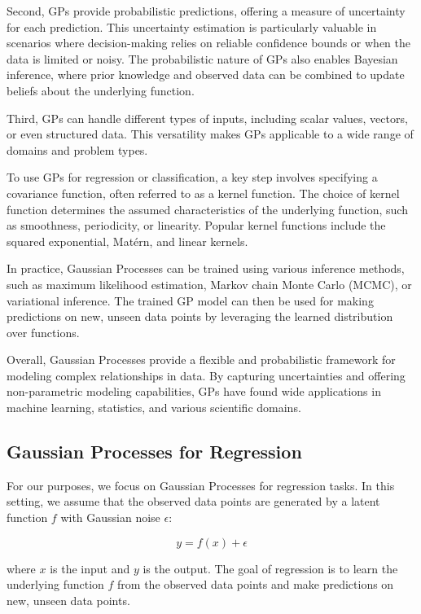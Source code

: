 \documentclass[preprint,journal]{vgtc}       %
\begin{document}
Second, GPs provide probabilistic predictions, offering a measure of uncertainty for each prediction. This uncertainty estimation is particularly valuable in scenarios where decision-making relies on reliable confidence bounds or when the data is limited or noisy. The probabilistic nature of GPs also enables Bayesian inference, where prior knowledge and observed data can be combined to update beliefs about the underlying function.

Third, GPs can handle different types of inputs, including scalar values, vectors, or even structured data. This versatility makes GPs applicable to a wide range of domains and problem types.

To use GPs for regression or classification, a key step involves specifying a covariance function, often referred to as a kernel function. The choice of kernel function determines the assumed characteristics of the underlying function, such as smoothness, periodicity, or linearity. Popular kernel functions include the squared exponential, Matérn, and linear kernels.

In practice, Gaussian Processes can be trained using various inference methods, such as maximum likelihood estimation, Markov chain Monte Carlo (MCMC), or variational inference. The trained GP model can then be used for making predictions on new, unseen data points by leveraging the learned distribution over functions.

Overall, Gaussian Processes provide a flexible and probabilistic framework for modeling complex relationships in data. By capturing uncertainties and offering non-parametric modeling capabilities, GPs have found wide applications in machine learning, statistics, and various scientific domains.

\subsection{Gaussian Processes for Regression}

For our purposes, we focus on Gaussian Processes for regression tasks. In this setting, we assume that the observed data points are generated by a latent function $f$ with Gaussian noise $\epsilon$:

\begin{equation}
    y = f(x) + \epsilon
\end{equation}

where $x$ is the input and $y$ is the output. The goal of regression is to learn the underlying function $f$ from the observed data points and make predictions on new, unseen data points.
\end{document}
